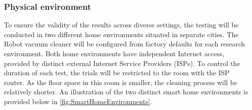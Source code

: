 \subsubsection{Physical environment}
To ensure the validity of the results across diverse settings, the testing will be conducted in two different home environments situated in separate cities. The Robot vacuum cleaner will be configured from factory defaults for each research environment. Both home environments have independent Internet access, provided by distinct external Internet Service Providers (ISPs). To control the duration of each test, the trials will be restricted to the room with the ISP router. As the floor space in this room is smaller, the cleaning process will be relatively shorter. An illustration of the two distinct smart home environments is provided below in \ref{fig:SmartHomeEnvironments}.

